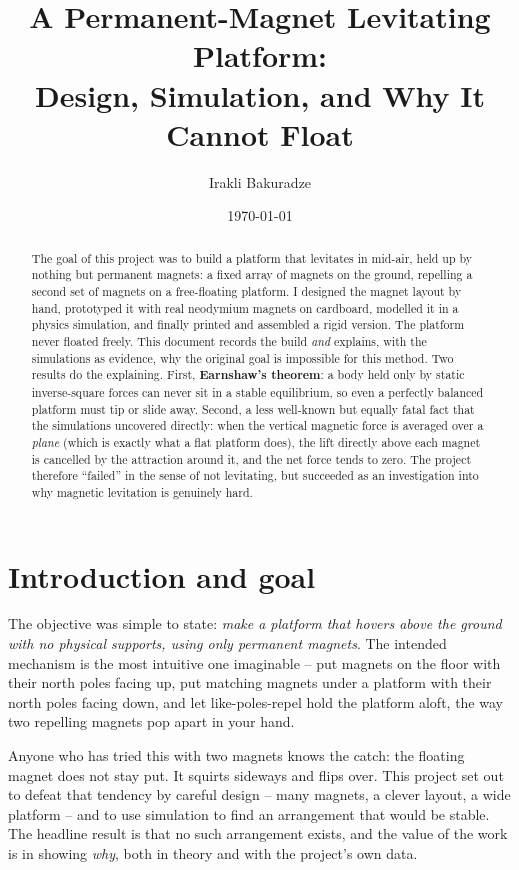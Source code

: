 \documentclass[11pt]{article}
\title{\textbf{A Permanent-Magnet Levitating Platform:\\
Design, Simulation, and Why It Cannot Float}}
\author{Irakli Bakuradze}
\date{\today}
\begin{document}
\maketitle

\begin{abstract}
\noindent
The goal of this project was to build a platform that levitates in mid-air,
held up by nothing but permanent magnets: a fixed array of magnets on the
ground, repelling a second set of magnets on a free-floating platform. I
designed the magnet layout by hand, prototyped it with real neodymium magnets
on cardboard, modelled it in a physics simulation, and finally printed and
assembled a rigid version. The platform never floated
freely. This document records the build \emph{and} explains, with the
simulations as evidence, why the original goal is impossible for this method.
Two results do the explaining. First, \textbf{Earnshaw's theorem}: a body held
only by static inverse-square forces can never sit in a stable equilibrium, so
even a perfectly balanced platform must tip or slide away. Second, a less
well-known but equally fatal fact that the simulations uncovered directly: when
the vertical magnetic force is averaged over a \emph{plane} (which is exactly
what a flat platform does), the lift directly above each magnet is cancelled by
the attraction around it, and the net force tends to zero. The project
therefore ``failed'' in the sense of not levitating, but succeeded as an
investigation into why magnetic levitation is genuinely hard.
\end{abstract}

\tableofcontents
\bigskip

\section{Introduction and goal}

The objective was simple to state: \emph{make a platform that hovers above the
ground with no physical supports, using only permanent magnets}. The intended
mechanism is the most intuitive one imaginable -- put magnets on the floor with
their north poles facing up, put matching magnets under a platform with their
north poles facing down, and let like-poles-repel hold the platform aloft, the
way two repelling magnets pop apart in your hand.

Anyone who has tried this with two magnets knows the catch: the floating magnet
does not stay put. It squirts sideways and flips over. This project set out to
defeat that tendency by careful design -- many magnets, a clever layout, a wide
platform -- and to use simulation to find an arrangement that would be stable.
The headline result is that no such arrangement exists, and the value of the
work is in showing \emph{why}, both in theory and with the project's own data.
\end{document}
